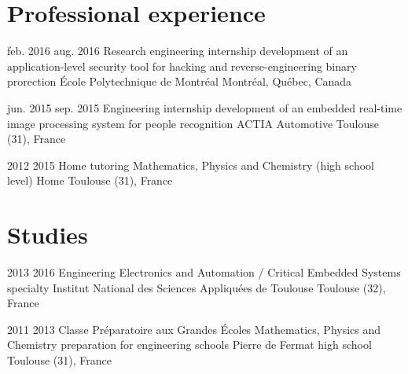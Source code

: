 \documentclass{custom_cv}
\begin{document}
\section{Professional experience}
\begin{Experience}
    \Item
    {feb. 2016}
    {aug. 2016}
    {Research engineering internship}
    {development of an application-level security tool for hacking and reverse-engineering binary prorection}
    {École Polytechnique de Montréal}
    {Montréal, Québec, Canada}

    \Item
    {jun. 2015}
    {sep. 2015}
    {Engineering internship}
    {development of an embedded real-time image processing system for people recognition}
    {ACTIA Automotive}
    {Toulouse (31), France}

    \Item
    {2012}
    {2015}
    {Home tutoring}
    {Mathematics, Physics and Chemistry (high school level)}
    {Home}
    {Toulouse (31), France}  
\end{Experience}

\section{Studies}
\begin{Experience}
    \Item
    {2013}
    {2016}
    {Engineering}
    {Electronics and Automation / Critical Embedded Systems specialty}
    {Institut National des Sciences Appliquées de Toulouse}
    {Toulouse (32), France}

    \Item
    {2011}
    {2013}
    {Classe Préparatoire aux Grandes Écoles}
    {Mathematics, Physics and Chemistry preparation for engineering schools}
    {Pierre de Fermat high school}
    {Toulouse (31), France}
\end{Experience}
\end{document}
